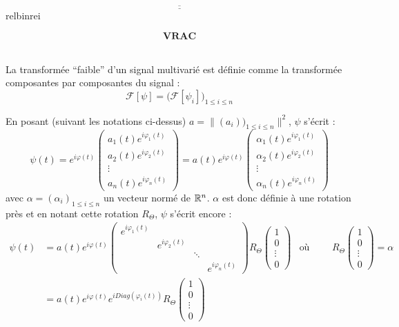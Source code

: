 \[\underline{\overline{\qquad\qquad\qquad\qquad\qquad\qquad\qquad\qquad\qquad\qquad\qquad\qquad\qquad\qquad\qquad\qquad\qquad\qquad}}\]{\color{white}relbinrei}

\[\textbf{VRAC}\] \\

\begin{definition}
	La transformée ``faible'' d'un signal multivarié est définie comme la transformée composantes par composantes du signal :
	\[\mathcal{F}[\psi] = \Big(\mathcal{F}[\psi_i]\Big)_{1\leq i\leq n}\]
\end{definition}


\begin{remarque}
	En posant (suivant les notations ci-dessus) $a = \big\|(a_i))_{1\leq i\leq n}\big\|^2$, $\psi$ s'écrit :
	\[\psi(t) = e^{i\varphi(t)}\begin{pmatrix} a_1(t)e^{i\varphi_1(t)} \\ a_2(t)e^{i\varphi_2(t)} \\ \vdots \\ a_n(t)e^{i\varphi_n(t)}
	\end{pmatrix} = a(t)e^{i\varphi(t)}\begin{pmatrix} \alpha_1(t)e^{i\varphi_1(t)} \\ \alpha_2(t)e^{i\varphi_2(t)} \\ \vdots \\ \alpha_n(t)e^{i\varphi_n(t)} \end{pmatrix}\]
	avec $\alpha = (\alpha_i)_{1\leq i\leq n}$ un vecteur normé de $\mathbb{R}^n$. $\alpha$ est donc définie à une rotation près et en notant cette rotation $R_\Theta$, $\psi$ s'écrit encore :
	\begin{align*}
	\psi(t) &= a(t)e^{i\varphi(t)}\begin{pmatrix} e^{i\varphi_1(t)} \\ & e^{i\varphi_2(t)} \\  & & \ddots \\ & & & e^{i\varphi_n(t)}\end{pmatrix} R_\Theta\begin{pmatrix} 1 \\ 0 \\ \vdots \\ 0 \end{pmatrix}   &  \text{où }\qquad R_\Theta\begin{pmatrix} 1 \\ 0 \\ \vdots \\ 0 \end{pmatrix} = \alpha\\
		&= a(t)e^{i\varphi(t)}e^{iDiag(\varphi_i(t))} R_\Theta\begin{pmatrix} 1 \\ 0 \\ \vdots \\ 0 \end{pmatrix}
	\end{align*}
\end{remarque}


